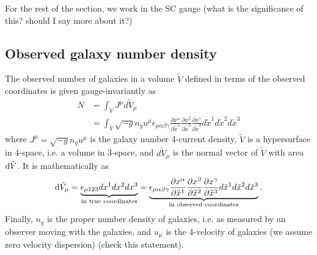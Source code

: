 \documentclass[11pt]{book}
\DeclareRobustCommand{\d}{\ifmmode\text{d}\else d\fi}
\begin{document}
For the rest of the section, we work in the SC gauge (what is the significance of this? should I say more about it?)

\subsection{Observed galaxy number density}
The observed number of galaxies in a volume $\tilde V$ defined in terms of the observed coordinates is given gauge-invariantly as
\begin{align}
    N &= \int_{\tilde V} J^\mu d\tilde V_\mu\\
    &= \int_{\tilde V} \sqrt{-g} n_g u^\mu \epsilon_{\mu\alpha\beta\gamma} \frac{\partial x^\alpha}{\partial \tilde x^1}\frac{\partial x^\beta}{\partial \tilde x^2}\frac{\partial x^\gamma}{\partial \tilde x^3} d\tilde x^1 d\tilde x^2 d\tilde x^3
\end{align}
where $J^\mu = \sqrt{-g} n_g u^\mu$ is the galaxy number 4-current density, $\tilde V$ is a hypersurface in 4-space, i.e. a volume in 3-space, and $d\tilde V_\mu$ is the normal vector of $\tilde V$ with area $\d \tilde V$. It is mathematically as
\begin{equation}
    \d \tilde V_\mu = \underbrace{\epsilon_{\mu 123} dx^1dx^2dx^3}_{\text{in true coordinates}} = \underbrace{\epsilon_{\mu \alpha\beta\gamma} \frac{\partial x^\alpha}{\partial \tilde x^1}\frac{\partial x^\beta}{\partial \tilde x^2}\frac{\partial x^\gamma}{\partial \tilde x^3} d\tilde x^1 d\tilde x^2 d\tilde x^3}_{\text{in observed coordinates}}.
\end{equation} 
Finally, $n_g$ is the proper number density of galaxies, i.e. as measured by an observer moving with the galaxies, and $u_\mu$ is the 4-velocity of galaxies (we assume zero velocity dispersion) (check this statement).
\end{document}
